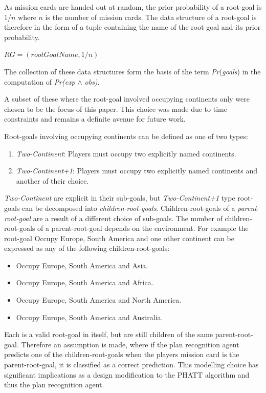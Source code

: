 \documentclass[parskip]{cs4rep}
\begin{document}
As mission cards are handed out at random, the prior probability of a root-goal is 1/$n$ where $n$ is the number of mission cards. The data structure of a root-goal is therefore in the form of a tuple containing the name of the root-goal and its prior probability.

\centerline{
 $RG = ( rootGoalName, 1/n)$\newline
}

The collection of these data structures form the basis of the term \textit{Pr}(\textit{goals}) in the computation of \textit{Pr(exp} $\wedge$ \textit{obs)}.

A subset of these where the root-goal involved occupying continents only were chosen to be the focus of this paper. This choice was made due to time constraints and remains a definite avenue for future work. 

Root-goals involving occupying continents can be defined as one of two types:

\begin{enumerate}
\item
\textit{Two-Continent}: Players must occupy two explicitly named continents.
\item
\textit{Two-Continent+1}: Players must occupy two explicitly named continents and another of their choice.
\end{enumerate}

\textit{Two-Continent} are explicit in their sub-goals, but \textit{Two-Continent+1} type root-goals can be decomposed into \textit{children-root-goals}. Children-root-goals of a \textit{parent-root-goal} are a result of a different choice of sub-goals. The number of children-root-goals of a parent-root-goal depends on the environment. For example the root-goal Occupy Europe, South America and one other continent can be expressed as any of the following children-root-goals:

\begin{itemize}
\item
Occupy Europe, South America and Asia.
\item
Occupy Europe, South America and Africa.
\item
Occupy Europe, South America and North America.
\item
Occupy Europe, South America and Australia.\newline
\end{itemize}

Each is a valid root-goal in itself, but are still children of the same parent-root-goal. Therefore an assumption is made, where if the plan recognition agent predicts one of the children-root-goals when the players mission card is the parent-root-goal, it is classified as a correct prediction. This modelling choice has significant implications as a design modification to the PHATT algorithm and thus the plan recognition agent.
\end{document}
